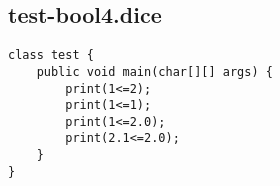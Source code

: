 \subsection{test-bool4.dice}
\begin{verbatim}
class test {
	public void main(char[][] args) {
		print(1<=2);
		print(1<=1);
		print(1<=2.0);
		print(2.1<=2.0);
	}
}
\end{verbatim}